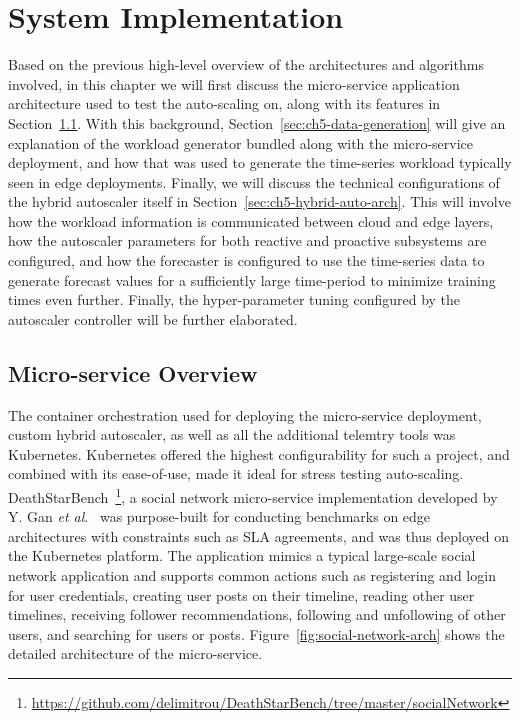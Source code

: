 \clearpage

\def\chaptertitle{System Implementation}

\lhead{\emph{\chaptertitle}}

\chapter{\chaptertitle}
\label{ch:experimental-setup}

Based on the previous high-level overview of the architectures and algorithms involved, in this chapter we will first discuss the micro-service application architecture used to test the auto-scaling on, along with its features in Section~\ref{sec:ch5-microservice-overview}. With this background, Section~\ref{sec:ch5-data-generation} will give an explanation of the workload generator bundled along with the micro-service deployment, and how that was used to generate the time-series workload typically seen in edge deployments. Finally, we will discuss the technical configurations of the hybrid autoscaler itself in Section~\ref{sec:ch5-hybrid-auto-arch}. This will involve how the workload information is communicated between cloud and edge layers, how the autoscaler parameters for both reactive and proactive subsystems are configured, and how the forecaster is configured to use the time-series data to generate forecast values for a sufficiently large time-period to minimize training times even further. Finally, the hyper-parameter tuning configured by the autoscaler controller will be further elaborated.

\section{Micro-service Overview}
\label{sec:ch5-microservice-overview}

The container orchestration used for deploying the micro-service deployment, custom hybrid autoscaler, as well as all the additional telemtry tools was Kubernetes. Kubernetes offered the highest configurability for such a project, and combined with its ease-of-use, made it ideal for stress testing auto-scaling. DeathStarBench~\footnote{\url{https://github.com/delimitrou/DeathStarBench/tree/master/socialNetwork}}, a social network micro-service implementation developed by Y. Gan \textit{et al}.~\cite{gan2019open} was purpose-built for conducting benchmarks on edge architectures with constraints such as SLA agreements, and was thus deployed on the Kubernetes platform. The application mimics a typical large-scale social network application and supports common actions such as registering and login for user credentials, creating user posts on their timeline, reading other user timelines, receiving follower recommendations, following and unfollowing of other users, and searching for users or posts. Figure~\ref{fig:social-network-arch} shows the detailed architecture of the micro-service.\par


